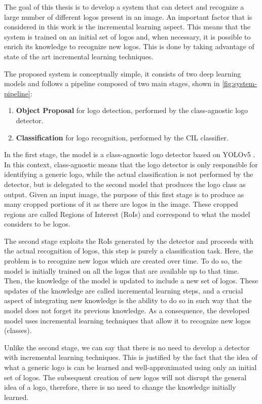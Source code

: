 The goal of this thesis is to develop a system that can detect and recognize 
a large number of different logos present in an image. An important factor that is considered in this work is the incremental learning aspect. This means that the system is trained on an initial set of logos and, when necessary, it is possible to enrich its knowledge to recognize new logos. This is done by taking advantage of state of the art incremental learning techniques.

The proposed system is conceptually simple, it consists of two deep learning models and follows a pipeline composed of two main stages, shown in \autoref{fig:system-pipeline}:

\begin{enumerate}
    \item \textbf{Object Proposal} for logo detection, performed by the class-agnostic logo detector.
    \item \textbf{Classification} for logo recognition, performed by the CIL classifier.
\end{enumerate}

In the first stage, the model is a class-agnostic logo detector based on YOLOv5 \cite{glenn_jocher_2021_5563715}. In this context, class-agnostic means that the logo detector is only responsible for identifying a generic logo, while the actual classification is not performed by the detector, but is delegated to the second model that produces the logo class as output.
Given an input image, the purpose of this first stage is to produce as many cropped portions of it as there are logos in the image. These cropped regions are called Regions of Interest (RoIs) and correspond to what the model considers to be logos.

The second stage exploits the RoIs generated by the detector and proceeds with the actual recognition of logos, this step is purely a classification task.
Here, the problem is to recognize new logos which are created over time. To do so, the model is initially trained on all the logos that are available up to that time. Then, the knowledge of the model is updated to include a new set of logos. These updates of the knowledge are called incremental learning steps, and a crucial aspect of integrating new knowledge is the ability to do so in such way that the model does not forget its previous knowledge. As a consequence, the developed model uses incremental learning techniques that allow it to recognize new logos (classes).

Unlike the second stage, we can say that there is no need to develop a detector with incremental learning techniques. This is justified by the fact that the idea of what a generic logo is can be learned and well-approximated using only an initial set of logos. The subsequent creation of new logos will not disrupt the general idea of a logo, therefore, there is no need to change the knowledge initially learned.


